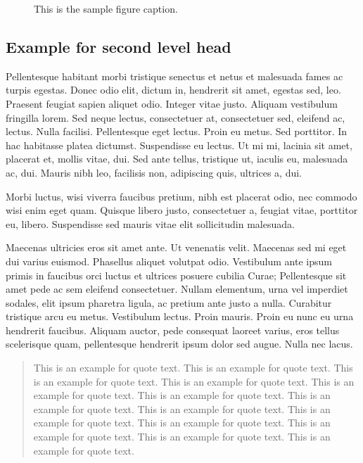 \documentclass[AMA]{WileyNJD-v1}
\begin{document}
\begin{figure*}
\caption{This is the sample figure caption.\label{fig2}}
\end{figure*}

\subsection{Example for second level head}

Pellentesque habitant morbi tristique senectus et netus et malesuada fames ac turpis egestas. Donec odio elit, dictum
in, hendrerit sit amet, egestas sed, leo. Praesent feugiat sapien aliquet odio. Integer vitae justo. Aliquam vestibulum
fringilla lorem. Sed neque lectus, consectetuer at, consectetuer sed, eleifend ac, lectus. Nulla facilisi. Pellentesque
eget lectus. Proin eu metus. Sed porttitor. In hac habitasse platea dictumst. Suspendisse eu lectus. Ut mi mi, lacinia
sit amet, placerat et, mollis vitae, dui. Sed ante tellus, tristique ut, iaculis eu, malesuada ac, dui. Mauris nibh leo,
facilisis non, adipiscing quis, ultrices a, dui.

Morbi luctus, wisi viverra faucibus pretium, nibh est placerat odio, nec commodo wisi enim eget quam. Quisque
libero justo, consectetuer a, feugiat vitae, porttitor eu, libero. Suspendisse sed mauris vitae elit sollicitudin malesuada.

Maecenas ultricies eros sit amet ante. Ut venenatis velit. Maecenas sed mi eget dui varius euismod. Phasellus aliquet
volutpat odio. Vestibulum ante ipsum primis in faucibus orci luctus et ultrices posuere cubilia Curae; Pellentesque sit
amet pede ac sem eleifend consectetuer. Nullam elementum, urna vel imperdiet sodales, elit ipsum pharetra ligula,
ac pretium ante justo a nulla. Curabitur tristique arcu eu metus. Vestibulum lectus. Proin mauris. Proin eu nunc eu
urna hendrerit faucibus. Aliquam auctor, pede consequat laoreet varius, eros tellus scelerisque quam, pellentesque
hendrerit ipsum dolor sed augue. Nulla nec lacus.

\begin{quote}
This is an example\cites{proceedRef,Galera_etal-2step_hybrid-10,Kucharik20122851} for quote text. This is an example for quote text. This is an example for quote text. This is an example for quote text.\cite{FLD:FLD3996} This is an example for quote text. This is an example for quote text. This is an example for quote text. This is an example for quote text. This is an example for quote text. This is an example for quote text.\cite{Barth-97} This is an example for quote text. This is an example for quote text. This is an example for quote text. 
\end{quote}
\end{document}
